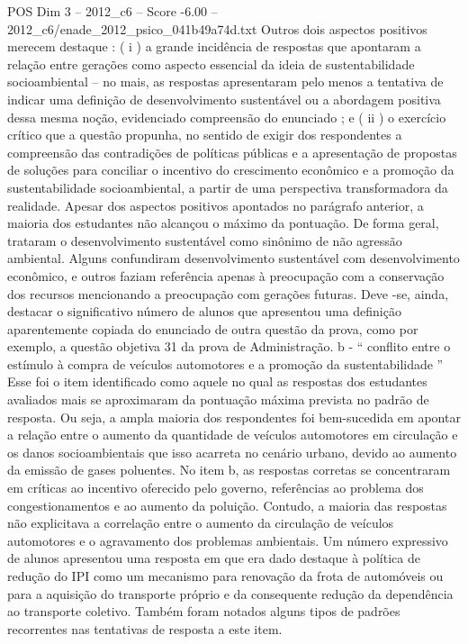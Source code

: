 \begin{textsample}{POS Dim 3 – 2012\_c6 – Score -6.00 – 2012\_c6/enade\_2012\_psico\_041b49a74d.txt}
Outros dois aspectos positivos merecem destaque : ( i ) a grande incidência de respostas que apontaram a relação entre gerações como aspecto essencial da ideia de sustentabilidade socioambiental – no mais, as respostas apresentaram pelo menos a tentativa de indicar uma definição de desenvolvimento sustentável ou a abordagem positiva dessa mesma noção, evidenciado compreensão do enunciado ; e ( ii ) o exercício crítico que a questão propunha, no sentido de exigir dos respondentes a compreensão das contradições de políticas públicas e a apresentação de propostas de soluções para conciliar o incentivo do crescimento econômico e a promoção da sustentabilidade socioambiental, a partir de uma perspectiva transformadora da realidade.
Apesar dos aspectos positivos apontados no parágrafo anterior, a maioria dos estudantes não alcançou o máximo da pontuação.
De forma geral, trataram o desenvolvimento sustentável como sinônimo de não agressão ambiental.
Alguns confundiram desenvolvimento sustentável com desenvolvimento econômico, e outros faziam referência apenas à preocupação com a conservação dos recursos mencionando a preocupação com gerações futuras.
Deve -se, ainda, destacar o significativo número de alunos que apresentou uma definição aparentemente copiada do enunciado de outra questão da prova, como por exemplo, a questão objetiva 31 da prova de Administração. b - “ conflito entre o estímulo à compra de veículos automotores e a promoção da sustentabilidade ” Esse foi o item identificado como aquele no qual as respostas dos estudantes avaliados mais se aproximaram da pontuação máxima prevista no padrão de resposta.
Ou seja, a ampla maioria dos respondentes foi bem-sucedida em apontar a relação entre o aumento da quantidade de veículos automotores em circulação e os danos socioambientais que isso acarreta no cenário urbano, devido ao aumento da emissão de gases poluentes.
No item b, as respostas corretas se concentraram em críticas ao incentivo oferecido pelo governo, referências ao problema dos congestionamentos e ao aumento da poluição.
Contudo, a maioria das respostas não explicitava a correlação entre o aumento da circulação de veículos automotores e o agravamento dos problemas ambientais.
Um número expressivo de alunos apresentou uma resposta em que era dado destaque à política de redução do IPI como um mecanismo para renovação da frota de automóveis ou para a aquisição do transporte próprio e da consequente redução da dependência ao transporte coletivo.
Também foram notados alguns tipos de padrões recorrentes nas tentativas de resposta a este item.

\end{textsample}
